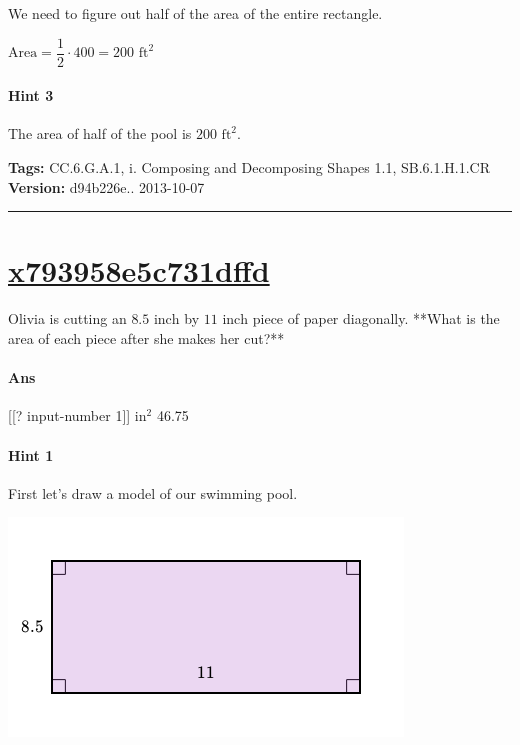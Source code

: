 \documentclass[twocolumn,10pt]{article}
\def\shrinkfactor{0.55}
\begin{document}
We need to figure out half of the area of the entire rectangle.    

${\text{Area}}=\dfrac{1}{2}\cdot400=200\text{ ft}^2$  

\paragraph{Hint 3}The area of half of the pool is $200\text{ ft}^2$.



\medskip
\noindent
\textbf{Tags:} {\footnotesize CC.6.G.A.1, i.	Composing and Decomposing Shapes 1.1, SB.6.1.H.1.CR}\\
\textbf{Version:} d94b226e.. 2013-10-07
\smallskip\hrule





\section{\href{https://www.khanacademy.org/devadmin/content/items/x793958e5c731dffd}{x793958e5c731dffd}}

\noindent
Olivia is cutting an $8.5\text{ inch}$ by $11\text{ inch}$ piece of paper diagonally.  **What is the area of each piece after she makes her cut?**  

\paragraph{Ans}  [[? input-number 1]] $\text{in}^2$  46.75

\paragraph{Hint 1}First let's draw a model of our swimming pool.  


\includegraphics[scale=\shrinkfactor]{figures/8a2c3ed0982713da37ab82c1f45c53d7c8168214.png}    
\end{document}
